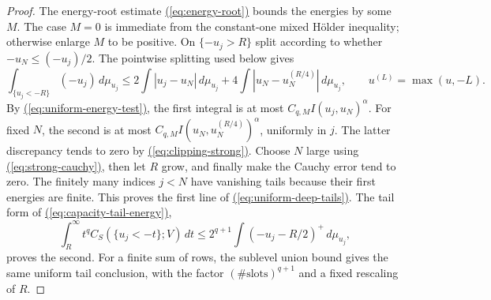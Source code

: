 \documentclass[11pt,reqno]{amsart}
\theoremstyle{definition}
\theoremstyle{remark}
\numberwithin{equation}{section}
\newcommand{\MathEqref}[1]{\begingroup\hypersetup{linkcolor=EquationLink}\hyperref[#1]{(\ref*{#1})}\endgroup}
\begin{document}
\begin{proof}
The energy-root estimate \MathEqref{eq:energy-root} bounds the energies by some $M$.
The case $M=0$ is immediate from the constant-one mixed H\"older
inequality; otherwise enlarge $M$ to be positive. On
$\{-u_j>R\}$ split according to whether
$-u_N\leq(-u_j)/2$. The pointwise splitting used below gives
\begin{equation}\label{eq:tail-splitting}
 \int_{\{u_j<-R\}}(-u_j)\,d\mu_{u_j}
 \leq 2\int|u_j-u_N|\,d\mu_{u_j}
       +4\int|u_N-u_N^{(R/4)}|\,d\mu_{u_j},
 \qquad u^{(L)}=\max(u,-L).
\end{equation}
By \MathEqref{eq:uniform-energy-test}, the first integral is at most
$C_{q,M}I(u_j,u_N)^\alpha$.
For fixed $N$, the second is at most
$C_{q,M}I(u_N,u_N^{(R/4)})^\alpha$, uniformly
in $j$. The latter discrepancy tends to zero by \MathEqref{eq:clipping-strong}.
Choose $N$ large using \MathEqref{eq:strong-cauchy}, then let $R$ grow, and finally
make the Cauchy error tend to zero. The finitely many indices
$j<N$ have vanishing tails because their first energies are
finite. This proves the first line of \MathEqref{eq:uniform-deep-tails}. The tail form of
\MathEqref{eq:capacity-tail-energy},
\begin{equation}\label{eq:strong-capacity-tail}
 \int_R^\infty t^q C_S(\{u_j<-t\};V)\,dt
       \leq 2^{q+1}\int(-u_j-R/2)^+\,d\mu_{u_j},
\end{equation}
proves the second. For a finite sum of rows, the sublevel union
bound gives the same uniform tail conclusion, with the factor
$(\#\text{slots})^{q+1}$ and a fixed rescaling of $R$.


\end{proof}
\end{document}

